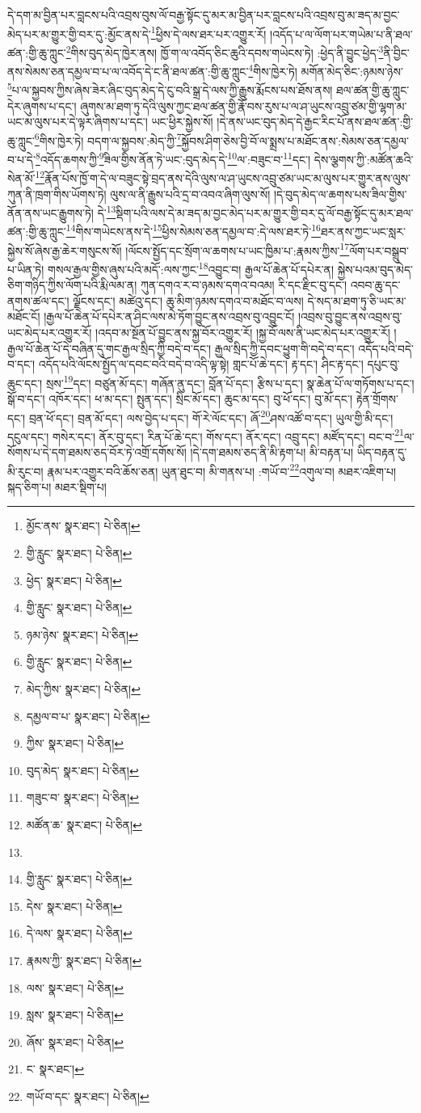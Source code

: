 དེ་དག་མ་བྱིན་པར་བླངས་པའི་འབྲས་བུས་ལོ་བརྒྱ་སྟོང་དུ་མར་མ་བྱིན་པར་བླངས་པའི་འབྲས་བུ་མ་ཟད་མ་བྱང་མེད་པར་མ་གྱུར་གྱི་བར་དུ་:མྱོང་ནས་དེ་\footnote{མྱོང་ནས་  སྣར་ཐང་།  པེ་ཅིན། }ཕྱིས་དེ་ལས་ཐར་པར་འགྱུར་རོ། །འདོད་པ་ལ་ལོག་པར་གཡེམ་པ་ནི་ཐལ་ཚན་:གྱི་ཆུ་ཀླུང་\footnote{གྱི་རླུང་  སྣར་ཐང་།  པེ་ཅིན། }གིས་བུད་མེད་ཁྱེར་ནས། ཁྱོ་ག་ལ་འབོད་ཅིང་ཆུའི་དབས་གཡེངས་ཏེ། :ཕྱེད་ནི་བྱུང་ཕྱེད་\footnote{ཕྱེད་  སྣར་ཐང་།  པེ་ཅིན། }ནི་བྱིང་ནས་སེམས་ཅན་དམྱལ་བ་པ་ལ་འབོད་དེ་ང་ནི་ཐལ་ཚན་:གྱི་ཆུ་ཀླུང་\footnote{གྱི་རླུང་  སྣར་ཐང་།  པེ་ཅིན། }གིས་ཁྱེར་ཏེ། མགོན་མེད་ཅིང་:ཉམས་ཉེས་\footnote{ཉམ་ཉེས་  སྣར་ཐང་།  པེ་ཅིན། }པ་ལ་སྐྱབས་ཀྱིས་ཞེས་ཟེར་ཞིང་བུད་མེད་དེ་ངུ་བའི་སྒྲ་དེ་ལས་ཀྱི་རྒྱུས་རྨོངས་པས་ཐོས་ནས། ཐལ་ཚན་གྱི་ཆུ་ཀླུང་དེར་ཞུགས་པ་དང་། ཞུགས་མ་ཐག་ཏུ་དེའི་ལུས་ཀྱང་ཐལ་ཚན་གྱི་རྣོ་བས་རུས་པ་ལ་ཤ་ཡུངས་འབྲུ་ཙམ་གྱི་ལྷག་མ་ཡང་མ་ལུས་པར་དེ་ལྟར་ཞིགས་པ་དང་། ཡང་ཕྱིར་སྐྱེས་སོ། །དེ་ནས་ཡང་བུད་མེད་དེ་རྒྱང་རིང་པོ་ནས་ཐལ་ཚན་:གྱི་ཆུ་ཀླུང་\footnote{གྱི་རླུང་  སྣར་ཐང་།  པེ་ཅིན། }གིས་ཁྱེར་ཏེ། བདག་ལ་སྐྱབས་:མེད་ཀྱི་\footnote{མེད་ཀྱིས་  སྣར་ཐང་།  པེ་ཅིན། }སྐྱོབས་ཤིག་ཅེས་བྱི་བོ་ལ་སྨྲས་པ་མཐོང་ནས་:སེམས་ཅན་དམྱལ་བ་པ་དེ་\footnote{དམྱལ་བ་པ་  སྣར་ཐང་།  པེ་ཅིན། }འདོད་ཆགས་ཀྱི་\footnote{ཀྱིས་  སྣར་ཐང་།  པེ་ཅིན། }ཟིལ་གྱིས་ནོན་ཏེ་ཡང་:བུད་མེད་དེ་\footnote{བུད་མེད་  སྣར་ཐང་།  པེ་ཅིན། }ལ་:བཟུང་བ་\footnote{གཟུང་བ་  སྣར་ཐང་།  པེ་ཅིན། }དང་། དེས་ལྕགས་ཀྱི་:མཚོན་ཆའི་སེན་མོ་\footnote{མཚོན་ཆ་  སྣར་ཐང་།  པེ་ཅིན། }རྣོན་པོས་ཁྱོ་ག་དེ་ལ་བཟུང་སྟེ་བྲད་ནས་དེའི་ལུས་ལ་ཤ་ཡུངས་འབྲུ་ཙམ་ཡང་མ་ལུས་པར་གྱུར་ནས་ལུས་ཀུན་ནི་ཁྲག་གིས་ཡོགས་ཏེ། ལུས་ལ་ནི་རྒྱུས་པའི་དྲ་བ་འབའ་ཞིག་ལུས་སོ། །དེ་བུད་མེད་ལ་ཆགས་པས་ཟིལ་གྱིས་ནོན་ནས་ཡང་རྒྱུགས་ཏེ། དེ་\footnote{}སྡིག་པའི་ལས་དེ་མ་ཟད་མ་བྱང་མེད་པར་མ་གྱུར་གྱི་བར་དུ་ལོ་བརྒྱ་སྟོང་དུ་མར་ཐལ་ཚན་:གྱི་ཆུ་ཀླུང་\footnote{གྱི་རླུང་  སྣར་ཐང་།  པེ་ཅིན། }གིས་གཡེངས་ནས་དེ་\footnote{དེས་  སྣར་ཐང་།  པེ་ཅིན། }ཕྱིས་སེམས་ཅན་དམྱལ་བ་:དེ་ལས་ཐར་ཏེ་\footnote{དེ་ལས་  སྣར་ཐང་།  པེ་ཅིན། }ཐར་ནས་ཀྱང་ཡང་སླར་སྐྱེས་སོ་ཞེས་རྒྱ་ཆེར་གསུངས་སོ། །ལོངས་སྤྱོད་དང་སྲོག་ལ་ཆགས་པ་ཡང་ཁྱིམ་པ་:རྣམས་ཀྱིས་\footnote{རྣམས་ཀྱི་  སྣར་ཐང་།  པེ་ཅིན། }ལོག་པར་བསྒྲུབ་པ་ཡིན་ཏེ། གསལ་རྒྱལ་གྱིས་ཞུས་པའི་མདོ་:ལས་ཀྱང་\footnote{ལས་  སྣར་ཐང་།  པེ་ཅིན། }འབྱུང་བ། རྒྱལ་པོ་ཆེན་པོ་དཔེར་ན། སྐྱེས་པའམ་བུད་མེད་ཅིག་གཉིད་ཀྱིས་ལོག་པའི་རྨི་ལམ་ན། ཀུན་དགའ་ར་བ་ཉམས་དགའ་བའམ། རི་དང་རྫིང་བུ་དང་། འབབ་ཆུ་དང་ནགས་ཚལ་དང་། ལྗོངས་དང་། མཚེའུ་དང་། ཆུ་མིག་ཉམས་དགའ་བ་མཐོང་བ་ལས། དེ་སད་མ་ཐག་ཏུ་ཅི་ཡང་མ་མཐོང་ངོ། །རྒྱལ་པོ་ཆེན་པོ་དཔེར་ན་ཤིང་ལས་མེ་ཏོག་བྱུང་ནས་འབྲས་བུ་འབྱུང་ངོ། །འབྲས་བུ་བྱུང་ནས་འབྲས་བུ་ཡང་མེད་པར་འགྱུར་རོ། །འདབ་མ་སྔོན་པོ་བྱུང་ནས་སྐྱ་བོར་འགྱུར་རོ། །སྐྱ་བོ་ལས་ནི་ཡང་མེད་པར་འགྱུར་རོ། །རྒྱལ་པོ་ཆེན་པོ་དེ་བཞིན་དུ་གང་རྒྱལ་སྲིད་ཀྱི་བདེ་བ་དང་། རྒྱལ་སྲིད་ཀྱི་དབང་ཕྱུག་གི་བདེ་བ་དང་། འདོད་པའི་བདེ་བ་དང་། འདོད་པའི་ལོངས་སྤྱོད་ལ་དབང་བའི་བདེ་བ་འདི་ལྟ་སྟེ། གླང་པོ་ཆེ་དང་། རྟ་དང་། ཤིང་རྟ་དང་། དཔུང་བུ་ཆུང་དང་། སྲས་\footnote{སླས་  སྣར་ཐང་།  པེ་ཅིན། }དང་། བཙུན་མོ་དང་། གཞོན་ནུ་དང་། བློན་པོ་དང་། རྩིས་པ་དང་། སྣ་ཆེན་པོ་ལ་གཏོགས་པ་དང་། སྒོ་བ་དང་། འཁོར་དང་། ཕ་མ་དང་། སྤུན་དང་། སྲིང་མོ་དང་། ཆུང་མ་དང་། བུ་ཕོ་དང་། བུ་མོ་དང་། རྟེན་གྲོགས་དང་། བྲན་ཕོ་དང་། བྲན་མོ་དང་། ལས་བྱེད་པ་དང་། གོ་རེ་ལོང་དང་། ཞོ་\footnote{ཞོས་  སྣར་ཐང་།  པེ་ཅིན། }ཤས་འཚོ་བ་དང་། ཡུལ་གྱི་མི་དང་། དངུལ་དང་། གསེར་དང་། ནོར་བུ་དང་། རིན་པོ་ཆེ་དང་། གོས་དང་། ནོར་དང་། འབྲུ་དང་། མཛོད་དང་། བང་བ་\footnote{ང་  སྣར་ཐང་། }ལ་སོགས་པ་དེ་དག་ཐམས་ཅད་བོར་ཏེ་འགྲོ་དགོས་སོ། །དེ་དག་ཐམས་ཅད་ནི་མི་རྟག་པ། མི་བརྟན་པ། ཡིད་བརྟན་དུ་མི་རུང་བ། རྣམ་པར་འགྱུར་བའི་ཆོས་ཅན། ཡུན་ཐུང་བ། མི་གནས་པ། :གཡོ་བ་\footnote{གཡོ་བ་དང་  སྣར་ཐང་།  པེ་ཅིན། }འགུལ་བ། མཐར་འཇིག་པ། སྐད་ཅིག་པ། མཐར་སྡིག་པ། 